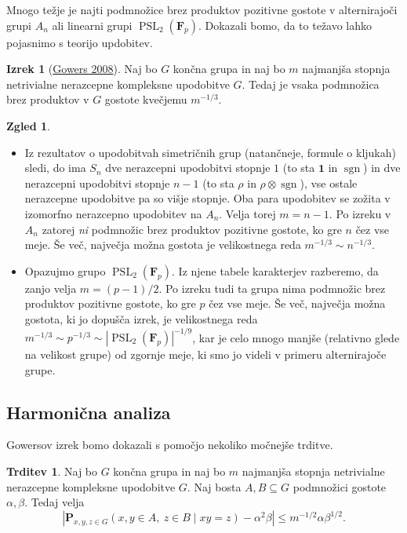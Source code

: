 \documentclass[11pt]{book}
\def\11{\mathbf{1}}
\def\FF{\mathbf{F}}
\def\PP{\mathbf{P}}
\DeclareMathOperator\sgn{sgn}
\DeclareMathOperator\PSL{PSL}
\theoremstyle{definition}
\theoremstyle{zgled}
\newtheorem*{zgled}{Zgled}
\theoremstyle{odprtproblem}
\theoremstyle{domacanaloga}
\theoremstyle{izrek}
\newtheorem*{izrek}{Izrek}
\newtheorem*{trditev}{Trditev}
\begin{document}
Mnogo težje je najti podmnožice brez produktov pozitivne gostote v alternirajoči grupi $A_n$ ali linearni grupi $\PSL_2(\FF_p)$. Dokazali bomo, da to težavo lahko pojasnimo s teorijo updobitev.

\begin{izrek}[\href{https://www.cambridge.org/core/journals/combinatorics-probability-and-computing/article/abs/quasirandom-groups/A885920D04E04BC63766C052C666931A}{Gowers 2008}]
Naj bo $G$ končna grupa in naj bo $m$ najmanjša stopnja netrivialne nerazcepne kompleksne upodobitve $G$. Tedaj je vsaka podmnožica brez produktov v $G$ gostote kvečjemu $m^{-1/3}$.
\end{izrek}

\begin{zgled} \leavevmode
\begin{itemize}
    \item Iz rezultatov o upodobitvah simetričnih grup (natančneje, formule o kljukah) sledi, do ima $S_n$ dve nerazcepni upodobitvi stopnje $1$ (to sta $\11$ in $\sgn$) in dve nerazcepni upodobitvi stopnje $n-1$ (to sta $\rho$ in $\rho \otimes \sgn$), vse ostale nerazcepne upodobitve pa so višje stopnje. Oba para upodobitev se zožita v izomorfno nerazcepno upodobitev na $A_n$. Velja torej $m = n-1$. Po izreku v $A_n$ zatorej \emph{ni} podmnožic brez produktov pozitivne gostote, ko gre $n$ čez vse meje. Še več, največja možna gostota je velikostnega reda $m^{-1/3} \sim n^{-1/3}$.

    \item Opazujmo grupo $\PSL_2(\FF_p)$. Iz njene tabele karakterjev razberemo, da zanjo velja $m = (p-1)/2$. Po izreku tudi ta grupa nima podmnožic brez produktov pozitivne gostote, ko gre $p$ čez vse meje. Še več, največja možna gostota, ki jo dopušča izrek, je velikostnega reda $m^{-1/3} \sim p^{-1/3} \sim |\PSL_2(\FF_p)|^{-1/9}$, kar je celo mnogo manjše (relativno glede na velikost grupe) od zgornje meje, ki smo jo videli v primeru alternirajoče grupe.
\end{itemize}
\end{zgled}

\subsection{Harmonična analiza}

Gowersov izrek bomo dokazali s pomočjo nekoliko močnejše trditve.

\begin{trditev}
Naj bo $G$ končna grupa in naj bo $m$ najmanjša stopnja netrivialne nerazcepne kompleksne upodobitve $G$. Naj bosta $A,B \subseteq G$ podmnožici gostote $\alpha, \beta$. Tedaj velja
\[
    \left| 
        \PP_{x,y,z \in G}(x,y \in A, \ z \in B \mid xy = z) - \alpha^2 \beta
    \right| 
    \leq
    m^{-1/2} \alpha \beta^{1/2}.
\]
\end{trditev}
\end{document}
